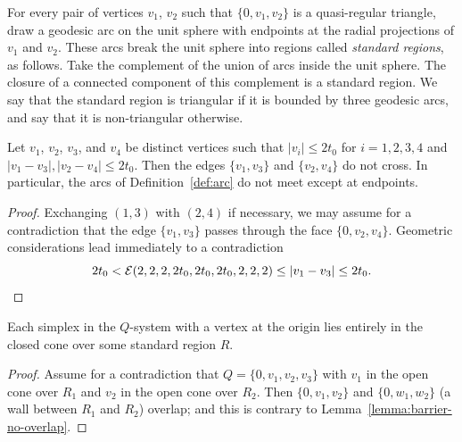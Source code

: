 \bigskip


\begin{definition} \label{def:arc} For every pair of vertices
$v_1$, $v_2$ such that $\{0,v_1,v_2\}$ is a quasi-regular
triangle,  draw a geodesic arc on the unit sphere with endpoints
at the radial projections of $v_1$ and $v_2$. These arcs break the
unit sphere into regions called {\it standard regions}, as
follows. Take the complement of the union of arcs inside the unit
sphere.  The closure of a connected component of this complement
is a  standard region. We say that the
standard region is triangular 
if it is bounded by three geodesic arcs, and say that it is
non-triangular otherwise.
%
\end{definition}

\begin{lemma}
\label{lemma:nocross}
 Let $v_1$, $v_2$, $v_3$, and $v_4$ be distinct vertices
such that $|v_i|\le 2t_0$ for $i=1,2,3,4$ and
$|v_1-v_3|,|v_2-v_4|\le 2t_0$. Then the edges $\{v_1,v_3\}$ and
$\{v_2,v_4\}$ do not cross. In particular, the arcs of
Definition~\ref{def:arc} do not meet except at endpoints.
\end{lemma}

\begin{proof} Exchanging $(1,3)$ with $(2,4)$ if necessary, we may
assume for a contradiction that the edge $\{v_1,v_3\}$ passes
through the face $\{0,v_2,v_4\}$.  Geometric considerations lead
immediately to a contradiction
    $$2t_0 < {\mathcal E}(2,2,2,2t_0,2t_0,2t_0,2,2,2) \le |v_1-v_3|\le 2t_0.$$
\end{proof}




\begin{lemma}
\label{lemma:Q-in-region} Each simplex in the $Q$-system with a
vertex at the origin lies entirely in the closed cone over some
standard region $R$.
\end{lemma}

\begin{proof}  Assume for a contradiction that $Q=\{0,v_1,v_2,v_3\}$
with $v_1$ in the open cone over $R_1$ and $v_2$ in the open cone
over $R_2$.  Then $\{0,v_1,v_2\}$ and $\{0,w_1,w_2\}$ (a wall
between $R_1$ and $R_2$) overlap; and this is contrary to
Lemma~\ref{lemma:barrier-no-overlap}.
\end{proof}

